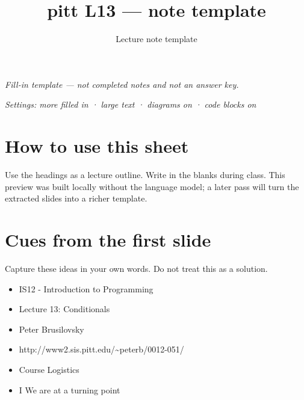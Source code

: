 \documentclass[14pt]{extarticle}
\title{pitt L13 — note template}
\author{Lecture note template}
\date{}
\begin{document}
\maketitle
\begin{center}
\textit{Fill-in template --- not completed notes and not an answer key.}
\end{center}
\noindent\textit{Settings: more filled in · large text · diagrams on · code blocks on}
\vspace{1em}
\section*{How to use this sheet}
Use the headings as a lecture outline. Write in the blanks during class.
This preview was built locally without the language model; a later pass will
turn the extracted slides into a richer template.
\section*{Cues from the first slide}
Capture these ideas in your own words. Do not treat this as a solution.
\begin{itemize}[leftmargin=*]
  \item IS12 - Introduction to Programming \hrulefill
  \vspace{1.1em}
  \item Lecture 13: Conditionals \hrulefill
  \vspace{1.1em}
  \item Peter Brusilovsky \hrulefill
  \vspace{1.1em}
  \item http://www2.sis.pitt.edu/\textasciitilde{}peterb/0012-051/ \hrulefill
  \vspace{1.1em}
  \item Course Logistics \hrulefill
  \vspace{1.1em}
  \item I We are at a turning point \hrulefill
  \vspace{1.1em}
\end{itemize}
\end{document}
